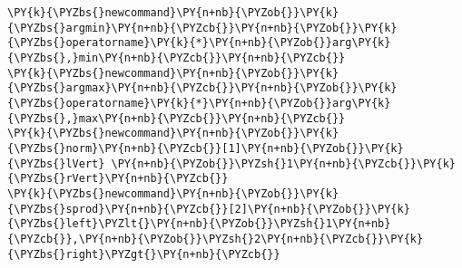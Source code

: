 \begin{Verbatim}[commandchars=\\\{\}]
\PY{k}{\PYZbs{}newcommand}\PY{n+nb}{\PYZob{}}\PY{k}{\PYZbs{}argmin}\PY{n+nb}{\PYZcb{}}\PY{n+nb}{\PYZob{}}\PY{k}{\PYZbs{}operatorname}\PY{k}{*}\PY{n+nb}{\PYZob{}}arg\PY{k}{\PYZbs{},}min\PY{n+nb}{\PYZcb{}}\PY{n+nb}{\PYZcb{}}
\PY{k}{\PYZbs{}newcommand}\PY{n+nb}{\PYZob{}}\PY{k}{\PYZbs{}argmax}\PY{n+nb}{\PYZcb{}}\PY{n+nb}{\PYZob{}}\PY{k}{\PYZbs{}operatorname}\PY{k}{*}\PY{n+nb}{\PYZob{}}arg\PY{k}{\PYZbs{},}max\PY{n+nb}{\PYZcb{}}\PY{n+nb}{\PYZcb{}}
\PY{k}{\PYZbs{}newcommand}\PY{n+nb}{\PYZob{}}\PY{k}{\PYZbs{}norm}\PY{n+nb}{\PYZcb{}}[1]\PY{n+nb}{\PYZob{}}\PY{k}{\PYZbs{}lVert} \PY{n+nb}{\PYZob{}}\PYZsh{}1\PY{n+nb}{\PYZcb{}}\PY{k}{\PYZbs{}rVert}\PY{n+nb}{\PYZcb{}}
\PY{k}{\PYZbs{}newcommand}\PY{n+nb}{\PYZob{}}\PY{k}{\PYZbs{}sprod}\PY{n+nb}{\PYZcb{}}[2]\PY{n+nb}{\PYZob{}}\PY{k}{\PYZbs{}left}\PYZlt{}\PY{n+nb}{\PYZob{}}\PYZsh{}1\PY{n+nb}{\PYZcb{}},\PY{n+nb}{\PYZob{}}\PYZsh{}2\PY{n+nb}{\PYZcb{}}\PY{k}{\PYZbs{}right}\PYZgt{}\PY{n+nb}{\PYZcb{}}
\end{Verbatim}

